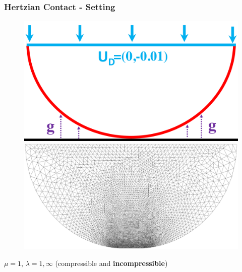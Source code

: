 \documentclass[8pt, oneside]{beamer}   	%
\newcommand{\titlecolor}[1]{\frametitle{\textcolor{dkgrey}{ \textbf{#1}}}}
\begin{document}
\begin{frame}
\titlecolor{Hertzian Contact - Setting}
\begin{figure}[htbp!]
\includegraphics[scale=0.15]{img/signorinicircle.pdf} \\
\includegraphics[scale=0.1]{img/deformed_mesh.eps} 
\end{figure}
$ \mu = 1$, $ \lambda = 1, \infty$ (compressible and \textbf{incompressible})
\end{frame}

\end{document}
